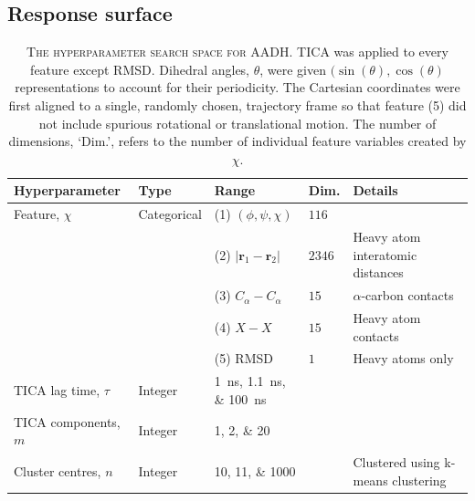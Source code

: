 \subsection{Response surface}\label{sec:aadh_rsm}

\begin{table}[h]
    \caption[The hyperparameter search space for AADH]{\textsc{The hyperparameter search space for AADH}. TICA was applied to every feature except RMSD. Dihedral angles, $\theta$, were given $(\sin(\theta),\cos(\theta)$ representations to account for their periodicity.  The Cartesian coordinates were first aligned to a single, randomly chosen, trajectory frame so that feature (5) did not include spurious rotational or translational motion. The number of dimensions, `Dim.', refers to the number of individual feature variables created by $\chi$.}
    \centering
    \begin{tabularx}{0.9\textwidth}{ >{\raggedright\arraybackslash}ll>{\raggedright\arraybackslash}Xl >{\raggedright\arraybackslash}X } 
    \toprule
    \textbf{Hyperparameter} & \textbf{Type} & \textbf{Range} & \textbf{Dim.} &\textbf{Details} \\
     \midrule
    Feature, $\chi$ & Categorical & (1) $(\phi, \psi, \chi)$ & $\num{116}$  & \\
    & & (2) $|\mathbf{r}_{1}-\mathbf{r}_{2}|$  & $\num{ 2346}$& Heavy atom interatomic distances \\
    & & (3) $C_{\alpha}-C_{\alpha}$ & $\num{15}$ & $\alpha$-carbon contacts\\ 
    & & (4) $X-X$  & $\num{15}$ & Heavy atom contacts\\ 
    & & (5) RMSD & $\num{1}$ &  Heavy atoms only\\ 
    \midrule
    TICA lag time, $\tau$ & Integer &\SIlist[list-final-separator = { ... }]{1;1.1;100}{ns} &  & \\
    \midrule
    TICA components, $m$& Integer &\numlist[list-final-separator = { ... }]{1;2;20} & & \\
    \midrule
    Cluster centres, $n$ & Integer & \numlist[list-final-separator = { ... }]{10;11;1000}& &  Clustered using k-means clustering  \\
    
     \bottomrule
    \end{tabularx}
    \label{tab:aadh_searchspace}
\end{table}

